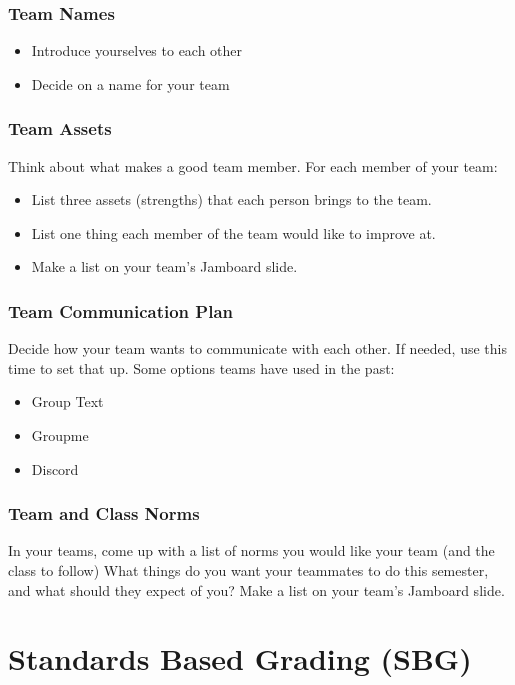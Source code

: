 \documentclass[aspectration=1610]{beamer}
\begin{document}
\begin{frame}\frametitle{Team Names}
\begin{itemize}
\item Introduce yourselves to each other
\item Decide on a name for your team
\end{itemize}
\end{frame}

\begin{frame}\frametitle{Team Assets}
Think about what makes a good team member.  For each member of your team:

\begin{itemize}
\item List three assets (strengths) that each person brings to the team.
\pause \item List one thing each member of the team would like to improve at.
\item Make a list on your team's Jamboard slide.
\end{itemize}
\end{frame}


  




\begin{frame}\frametitle{Team Communication Plan}

Decide how your team wants to communicate with each other. If needed, use this time to set that up.
\vfill
Some options teams have used in the past:
\begin{itemize}
\item Group Text
\item Groupme
\item Discord
\end{itemize}
\end{frame}

\begin{frame}\frametitle{Team and Class Norms}

In your teams, come up with a list of norms you would like your team (and the class to follow)
\vfill
What things do you want your teammates to do this semester, and what should they expect of you?
\vfill
Make a list on your team's Jamboard slide.
\end{frame}

\section{Standards Based Grading (SBG)}
%
%
\end{document}
